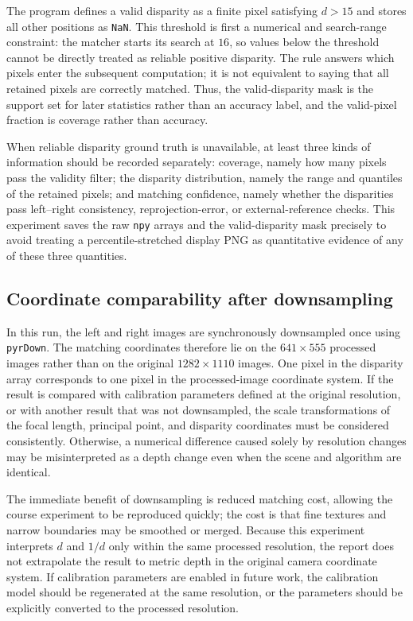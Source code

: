 The program defines a valid disparity as a finite pixel satisfying $d>15$ and stores all other positions as \texttt{NaN}. This threshold is first a numerical and search-range constraint: the matcher starts its search at $16$, so values below the threshold cannot be directly treated as reliable positive disparity. The rule answers which pixels enter the subsequent computation; it is not equivalent to saying that all retained pixels are correctly matched. Thus, the valid-disparity mask is the support set for later statistics rather than an accuracy label, and the valid-pixel fraction is coverage rather than accuracy.

When reliable disparity ground truth is unavailable, at least three kinds of information should be recorded separately: coverage, namely how many pixels pass the validity filter; the disparity distribution, namely the range and quantiles of the retained pixels; and matching confidence, namely whether the disparities pass left--right consistency, reprojection-error, or external-reference checks. This experiment saves the raw \texttt{npy} arrays and the valid-disparity mask precisely to avoid treating a percentile-stretched display PNG as quantitative evidence of any of these three quantities.

\subsection{Coordinate comparability after downsampling}

In this run, the left and right images are synchronously downsampled once using \texttt{pyrDown}. The matching coordinates therefore lie on the $641\times555$ processed images rather than on the original $1282\times1110$ images. One pixel in the disparity array corresponds to one pixel in the processed-image coordinate system. If the result is compared with calibration parameters defined at the original resolution, or with another result that was not downsampled, the scale transformations of the focal length, principal point, and disparity coordinates must be considered consistently. Otherwise, a numerical difference caused solely by resolution changes may be misinterpreted as a depth change even when the scene and algorithm are identical.

The immediate benefit of downsampling is reduced matching cost, allowing the course experiment to be reproduced quickly; the cost is that fine textures and narrow boundaries may be smoothed or merged. Because this experiment interprets $d$ and $1/d$ only within the same processed resolution, the report does not extrapolate the result to metric depth in the original camera coordinate system. If calibration parameters are enabled in future work, the calibration model should be regenerated at the same resolution, or the parameters should be explicitly converted to the processed resolution.
